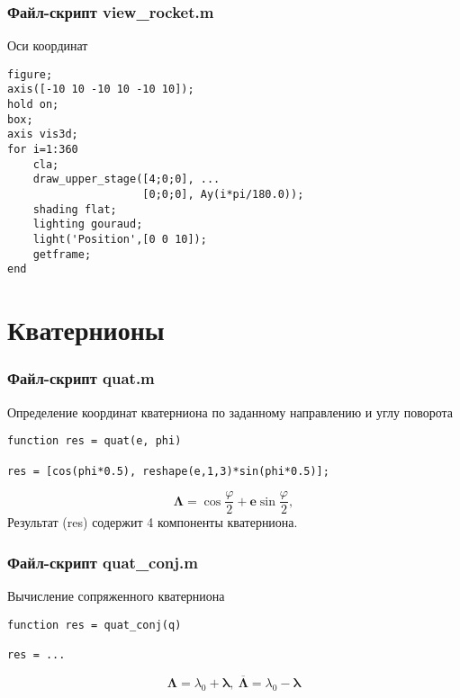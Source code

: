 \documentclass[12pt, compress]{beamer}
\renewcommand{\emph}[1]{\textcolor{dark-blue}{#1}}
\begin{document}
\begin{frame}[c, fragile]
\frametitle{Файл-скрипт \emph{view\_rocket.m}}
Оси координат
\begin{lstlisting}
figure;
axis([-10 10 -10 10 -10 10]);
hold on;
box;
axis vis3d;
for i=1:360
    cla;
    draw_upper_stage([4;0;0], ...
                     [0;0;0], Ay(i*pi/180.0));
    shading flat;
    lighting gouraud;
    light('Position',[0 0 10]);
    getframe;
end
\end{lstlisting}
\end{frame}

\section{Кватернионы}

\begin{frame}[c, fragile]
\frametitle{Файл-скрипт \emph{quat.m}}
Определение координат кватерниона по заданному направлению и углу поворота
\begin{lstlisting}
function res = quat(e, phi)

res = [cos(phi*0.5), reshape(e,1,3)*sin(phi*0.5)];

\end{lstlisting}
$$
  \boldsymbol \Lambda = \cos \frac{\varphi}{2} + \boldsymbol{e} \sin \frac{\varphi}{2},
$$
Результат (\emph{res}) содержит 4 компоненты кватерниона.
\end{frame}


\begin{frame}[c, fragile]
\frametitle{Файл-скрипт \emph{quat\_conj.m}}
Вычисление сопряженного кватерниона
\begin{lstlisting}
function res = quat_conj(q)

res = ...

\end{lstlisting}
\begin{equation*}
\boldsymbol \Lambda = \lambda_0 + \boldsymbol \lambda, \ \overline{\boldsymbol \Lambda} = \lambda_0 - \pmb \lambda
\end{equation*}
\end{frame}
\end{document}
